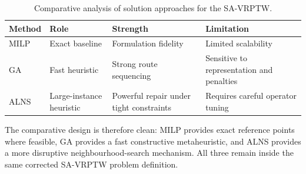 \begin{table}[ht]
\centering
\caption{Comparative analysis of solution approaches for the SA-VRPTW.}
\label{tab:solver_comparison}
\begin{tabular}{llll}
\toprule
\textbf{Method} & \textbf{Role} & \textbf{Strength} & \textbf{Limitation} \\
\midrule
MILP  & Exact baseline & Formulation fidelity & Limited scalability \\
GA    & Fast heuristic & Strong route sequencing & Sensitive to representation and penalties \\
ALNS  & Large-instance heuristic & Powerful repair under tight constraints & Requires careful operator tuning \\
\bottomrule
\end{tabular}
\end{table}

The comparative design is therefore clean: MILP provides exact reference points where feasible, GA provides a fast constructive metaheuristic, and ALNS provides a more disruptive neighbourhood-search mechanism. All three remain inside the same corrected SA-VRPTW problem definition.
